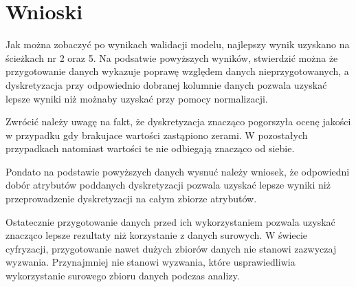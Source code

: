 \documentclass[12pt,oneside,a4paper]{book} %
\theoremstyle{break}
\begin{document}
\chapter*{Wnioski}

Jak można zobaczyć po wynikach walidacji modelu, najlepszy wynik uzyskano na ścieżkach nr 2 oraz 5. Na podsatwie powyższych wyników, stwierdzić można że przygotowanie danych wykazuje poprawę względem danych nieprzygotowanych, a dyskretyzacja przy odpowiednio dobranej kolumnie danych pozwala uzyskać lepsze wyniki niż możnaby uzyskać przy pomocy normalizacji.

Zwrócić należy uwagę na fakt, że dyskretyzacja znacząco pogorszyła ocenę jakości w przypadku gdy brakujace wartości zastąpiono zerami. W pozostałych przypadkach natomiast wartości te nie odbiegają znacząco od siebie.

Pondato na podstawie powyższych danych wysnuć należy wniosek, że odpowiedni dobór atrybutów poddanych dyskretyzacji pozwala uzyskać lepsze wyniki niż przeprowadzenie dyskretyzacji na całym zbiorze atrybutów.

Ostatecznie przygotowanie danych przed ich wykorzystaniem pozwala uzyskać znacząco lepsze rezultaty niż korzystanie z danych surowych. W świecie cyfryzacji, przygotowanie nawet dużych zbiorów danych nie stanowi zazwyczaj wyzwania. Przynajmniej nie stanowi wyzwania, które usprawiedliwia wykorzystanie surowego zbioru danych podczas analizy.
\end{document}
